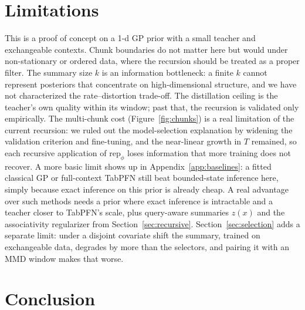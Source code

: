 \documentclass[11pt]{article}
\newcommand{\rep}{\mathrm{rep}}
\begin{document}
\begin{table}[t]
\centering
\caption{Context selection on TabArena regression (OpenML study 457).
Budget $n = 0.1N$. Average rank and mean RMSE on standardized targets
(lower is better). Bold marks the best budget-matched method.}
\label{tab:tabarena}

\end{table}

\section{Limitations}
\label{sec:limitations}

This is a proof of concept on a 1-d GP prior with a small teacher and
exchangeable contexts. Chunk boundaries do not matter here but would under
non-stationary or ordered data, where the recursion should be treated as a
proper filter. The summary size $k$ is an information bottleneck: a finite
$k$ cannot represent posteriors that concentrate on high-dimensional
structure, and we have not characterized the rate--distortion trade-off.
The distillation ceiling is the teacher's own quality within its window;
past that, the recursion is validated only empirically. The multi-chunk
cost (Figure~\ref{fig:chunks}) is a real limitation of the current
recursion: we ruled out the model-selection explanation by widening the
validation criterion and fine-tuning, and the near-linear growth in $T$
remained, so each recursive application of $\rep_\phi$ loses information
that more training does not recover. A more basic limit shows up
in Appendix~\ref{app:baselines}: a fitted classical GP or full-context
TabPFN still beat bounded-state inference here, simply because exact
inference on this prior is already cheap. A real advantage over such
methods needs a prior where exact inference is intractable and a teacher
closer to TabPFN's scale, plus query-aware summaries $z(x)$ and the
associativity regularizer from Section~\ref{sec:recursive}.
Section~\ref{sec:selection} adds a separate limit: under a disjoint
covariate shift the summary, trained on exchangeable data, degrades by more
than the selectors, and pairing it with an MMD window makes that worse.

\section{Conclusion}
\end{document}

